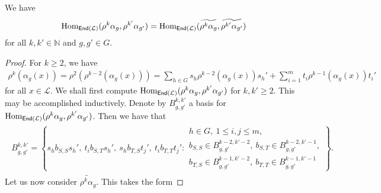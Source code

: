 \begin{lemma} We have
\begin{align*}
\textup{Hom}_{\textup{\textsf{End}}(\mathcal{L})}(\rho^k\alpha_g, \rho^{k'}\alpha_{g'}) = \textup{Hom}_{\textup{\textsf{End}}(\mathcal{L})}(\widetilde{\rho^k\alpha_g}, \widetilde{\rho^{k'}\alpha_{g'}})
\end{align*}
\noindent for all $k, k' \in \mathbb{N}$ and $g, g' \in G$.\\
\end{lemma}

\noindent\begin{proof} For $k \geq 2$, we have
\begin{align*}
\rho^k(\alpha_g(x)) = \rho^2(\rho^{k-2}(\alpha_g(x))) = \sum_{h \in G}s_h\rho^{k-2}(\alpha_g(x))s_h' + \sum_{i=1}^m t_i\rho^{k-1}(\alpha_g(x))t_i'
\end{align*}
\noindent for all $x \in \mathcal{L}$. We shall first compute $\textup{Hom}_{\textup{\textsf{End}}(\mathcal{L})}(\rho^k\alpha_g, \rho^{k'}\alpha_{g'})$ for $k, k' \geq 2$. This may be accomplished inductively. Denote by $B^{k, k'}_{g,g'}$ a basis for $\textup{Hom}_{\textup{\textsf{End}}(\mathcal{L})}(\rho^k\alpha_g, \rho^{k'}\alpha_{g'})$. Then we have that
\begin{align*}
\begin{split}
B^{k, k'}_{g,g'} = \left\{s_hb_{S,S}s_h',\ t_ib_{S,T}s_h',\ s_hb_{T,S}t_j',\ t_ib_{T,T}t_j' : \begin{matrix}h \in G,\ 1 \leq i, j \leq m,\\b_{S,S} \in B^{k-2, k'-2}_{g,g'},\ b_{S,T} \in B^{k-2, k'-1}_{g,g'},\\b_{T,S} \in B^{k-1, k'-2}_{g,g'},\ b_{T,T} \in B^{k-1, k'-1}_{g,g'}\end{matrix}\right\}.
\end{split}
\end{align*}
\noindent Let us now consider $\widetilde{\rho^k\alpha_g}$. This takes the form

\end{proof}
